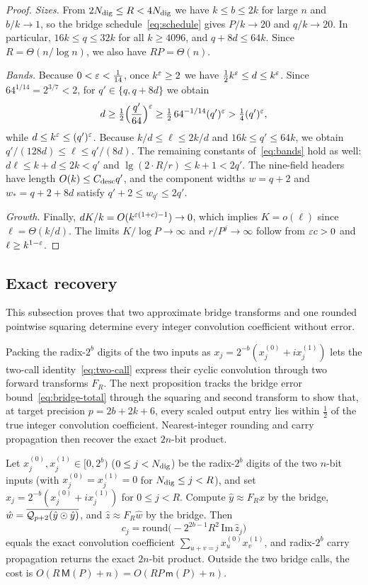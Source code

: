 \begin{proof}
\emph{Sizes.} From $2N_{\rm dig}\le R<4N_{\rm dig}$ we have $k\le b\le2k$ for large $n$ and $b/k\to1$, so the bridge
schedule~\eqref{eq:schedule} gives $P/k\to20$ and $q/k\to20$. In particular, $16k\le q\le32k$ for all $k\ge4096$, and
$q+8d\le64k$. Since $R=\Theta(n/\log n)$, we also have $RP=\Theta(n)$.

\emph{Bands.} Because $0<\varepsilon<\frac1{14}$, once $k^\varepsilon\ge2$ we have $\frac12k^\varepsilon\le d\le k^\varepsilon$. Since
$64^{1/14}=2^{3/7}<2$, for $q'\in\{q,q+8d\}$ we obtain
\[
  d\ge\tfrac12\Bigl(\frac{q'}{64}\Bigr)^\varepsilon\ge\tfrac12\,64^{-1/14}(q')^\varepsilon>\tfrac14(q')^\varepsilon,
\]
while $d\le k^\varepsilon\le(q')^\varepsilon$. Because $k/d\le\ell\le2k/d$ and $16k\le q'\le64k$, we obtain
$q'/(128d)\le\ell\le q'/(8d)$. The remaining constants of~\eqref{eq:bands} hold as well: $d\ell\le k+d\le2k<q'$ and
$\lg(2\cdot R/r)\le k+1<2q'$. The nine-field headers have length $O(k)\le C_{\rm desc}q'$, and the component widths
$w=q+2$ and $w_*=q+2+8d$ satisfy $q'+2\le w_{q'}\le2q'$.

\emph{Growth.} Finally, $dK/k=O(k^{\varepsilon(1+c)-1})\to0$, which implies $K=o(\ell)$ since $\ell=\Theta(k/d)$. The limits
$K/\log P\to\infty$ and $r/P^j\to\infty$ follow from $\varepsilon c>0$ and $\ell\ge k^{1-\varepsilon}$.
\end{proof}

\subsection{Exact recovery}\label{sec:main-recovery}

This subsection proves that two approximate bridge transforms and one rounded pointwise squaring determine every integer
convolution coefficient without error.

Packing the radix-$2^b$ digits of the two inputs as $x_j=2^{-b}(x^{(0)}_j+ix^{(1)}_j)$ lets the two-call
identity~\eqref{eq:two-call} express their cyclic convolution through two forward transforms $F_R$. The next proposition
tracks the bridge error bound~\eqref{eq:bridge-total} through the squaring and second transform to show that, at target
precision $p=2b+2k+6$, every scaled output entry lies within $\frac12$ of the true integer convolution coefficient.
Nearest-integer rounding and carry propagation then recover the exact $2n$-bit product.

\begin{proposition}\label{prop:root-packing}
Let $x^{(0)}_j,x^{(1)}_j\in[0,2^b)$ ($0\le j<N_{\rm dig}$) be the radix-$2^b$ digits of the two $n$-bit inputs (with
$x^{(0)}_j=x^{(1)}_j=0$ for $N_{\rm dig}\le j<R$), and set $x_j=2^{-b}(x^{(0)}_j+ix^{(1)}_j)$ for $0\le j<R$. Compute
$\hat y\approx F_Rx$ by the bridge, $\hat w=\overline{\mathcal{Q}_{p+2}(\hat y\odot\hat y)}$, and $\hat z\approx F_R\hat w$
by the bridge. Then
\[
  c_j=\mathrm{round}\bigl(-2^{2b-1}R^2\,\mathrm{Im}\,\hat z_j\bigr)
\]
equals the exact convolution coefficient $\sum_{u+v=j}x^{(0)}_u x^{(1)}_v$, and radix-$2^b$ carry propagation returns
the exact $2n$-bit product. Outside the two bridge calls, the cost is $O(R\,\mathsf M(P)+n)=O(RP\,\mathsf m(P)+n)$.
\end{proposition}

